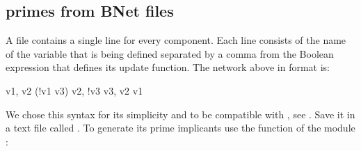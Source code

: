\documentclass[letterpaper,10pt,english]{sphinxmanual}
\begin{document}
\begin{sphinxVerbatim}[commandchars=\\\{\}]
  
  
  \PYG{p}{[}\PYG{p}{]}
\end{sphinxVerbatim}


\subsection{primes from BNet files}
\label{\detokenize{Manual:primes-from-bnet-files}}\label{\detokenize{Manual:id1}}
A  file contains a single line for every component.
Each line consists of the name of the variable that is being defined separated by a comma from the Boolean expression that defines its update function.
The network above in  format is:

\begin{sphinxVerbatim}[commandchars=\\\{\}]
v1,   v2 \PYGZam{} (!v1 \textbar{} v3)
v2,   !v3
v3,   v2 \textbar{} v1
\end{sphinxVerbatim}

We chose this syntax for its simplicity and to be compatible with , see {\hyperref[\detokenize{Bibliography:mussel2010}]{}}.
Save it in a text file called .
To generate its prime implicants use the function {\hyperref[\detokenize{FileExchange:bnet2primes}]{}} of the module {\hyperref[\detokenize{FileExchange:fileexchange}]{}}:
\end{document}
